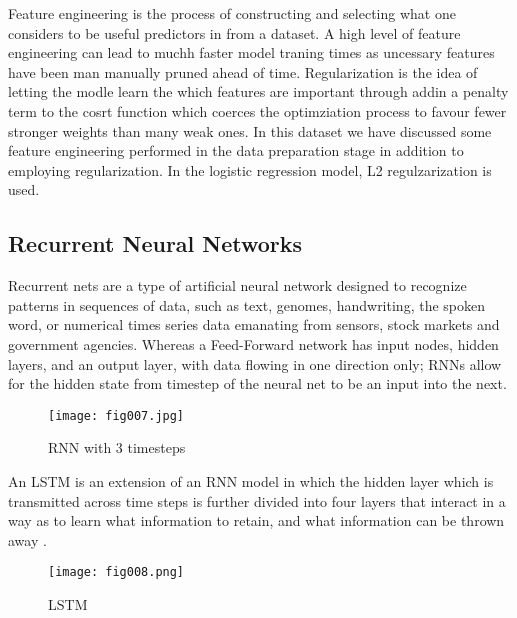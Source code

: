 Feature engineering is the process of constructing and selecting what one considers to be useful predictors in from a dataset. A high level of feature engineering can lead to muchh faster model traning times as uncessary features have been man manually pruned ahead of time. Regularization is the idea of letting the modle learn the which features are important through addin a penalty term to the cosrt function which coerces the optimziation process to favour fewer stronger weights than many weak ones. In this dataset we have discussed some feature engineering performed in the data preparation stage in addition to employing regularization. In the logistic regression model, L2 regulzarization is used.






\hfill \break
\hfill \break
\hfill \break
\hfill \break





\subsection{Recurrent Neural Networks}

Recurrent nets are a type of artificial neural network designed to recognize patterns in sequences of data, such as text, genomes, handwriting, the spoken word, or numerical times series data emanating from sensors, stock markets and government agencies. Whereas a Feed-Forward network has input nodes, hidden layers, and an output layer, with data flowing in one direction only; RNNs allow for the hidden state from timestep of the neural net to be an input into the next.

\begin{figure}[h!]
	\centering
	\texttt{[image: fig007.jpg]}
	\caption{RNN with 3 timesteps}
	\label{fig:fig7}
\end{figure} 

An LSTM is an extension of an RNN model in which the hidden layer which is transmitted across time steps is further divided into four layers that interact in a way as to learn what information to retain, and what information can be thrown away \parencite{Olah}. 

\begin{figure}[h!]
	\centering
	\texttt{[image: fig008.png]}
	\caption{LSTM}
	\label{fig:fig8}
\end{figure} 
